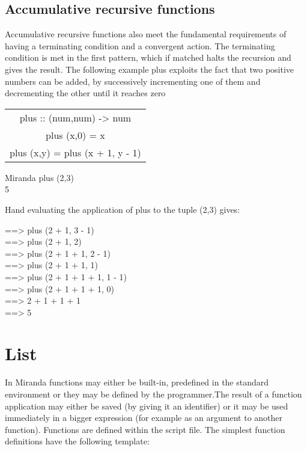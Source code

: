 \documentclass[11pt]{article}
\begin{document}
\subsection{Accumulative recursive functions}

Accumulative recursive functions also meet the fundamental requirements of having a terminating
condition and a convergent action. The terminating condition is met in the first
pattern, which if matched halts the recursion and gives the result. The following example
plus exploits the fact that two positive numbers can be added, by successively
incrementing one of them and decrementing the other until it reaches zero


\begin{center}
    \begin{tabular}{|c|}
         \hline
         plus :: (num,num) -> num\\
plus (x,0) = x\\
plus (x,y) = plus (x + 1, y - 1)\\
\hline
    \end{tabular}
    
    
\end{center}

\begin{tcolorbox}
Miranda plus (2,3)\\
5
\end{tcolorbox}
Hand evaluating the application of plus to the tuple (2,3) gives:

\begin{flushleft}
==> plus (2 + 1, 3 - 1)\\
==> plus (2 + 1, 2)\\
==> plus (2 + 1 + 1, 2 - 1)\\
==> plus (2 + 1 + 1, 1)\\
==> plus (2 + 1 + 1 + 1, 1 - 1)\\
==> plus (2 + 1 + 1 + 1, 0)\\
==> 2 + 1 + 1 + 1\\
==> 5\\
\end{flushleft}




\section{List}
In  Miranda functions may either be built-in, predefined in the standard environment or they may be defined by the programmer.The result of a function application may either be saved (by giving it an identifier) or it may be
used immediately in a bigger expression (for example as an argument to another
function). Functions are defined within the script file. The simplest function
definitions have the following template:
\\
\end{document}
